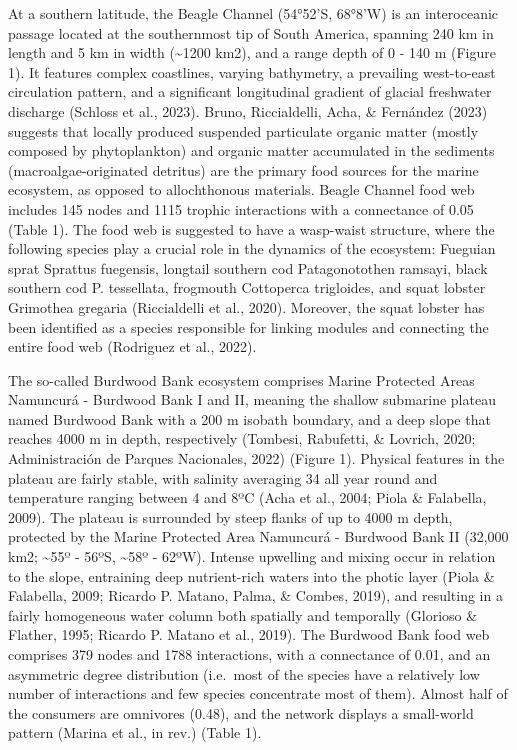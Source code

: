 \documentclass[
]{article}
\begin{document}
At a southern latitude, the Beagle Channel (54°52'S, 68°8'W) is an
interoceanic passage located at the southernmost tip of South America,
spanning 240 km in length and 5 km in width (\textasciitilde1200 km2),
and a range depth of 0 - 140 m (Figure 1). It features complex
coastlines, varying bathymetry, a prevailing west-to-east circulation
pattern, and a significant longitudinal gradient of glacial freshwater
discharge (Schloss et al., 2023). Bruno, Riccialdelli, Acha, \&
Fernández (2023) suggests that locally produced suspended particulate
organic matter (mostly composed by phytoplankton) and organic matter
accumulated in the sediments (macroalgae-originated detritus) are the
primary food sources for the marine ecosystem, as opposed to
allochthonous materials. Beagle Channel food web includes 145 nodes and
1115 trophic interactions with a connectance of 0.05 (Table 1). The food
web is suggested to have a wasp-waist structure, where the following
species play a crucial role in the dynamics of the ecosystem: Fueguian
sprat Sprattus fuegensis, longtail southern cod Patagonotothen ramsayi,
black southern cod P. tessellata, frogmouth Cottoperca trigloides, and
squat lobster Grimothea gregaria (Riccialdelli et al., 2020). Moreover,
the squat lobster has been identified as a species responsible for
linking modules and connecting the entire food web (Rodriguez et al.,
2022).

The so-called Burdwood Bank ecosystem comprises Marine Protected Areas
Namuncurá - Burdwood Bank I and II, meaning the shallow submarine
plateau named Burdwood Bank with a 200 m isobath boundary, and a deep
slope that reaches 4000 m in depth, respectively (Tombesi, Rabufetti, \&
Lovrich, 2020; Administración de Parques Nacionales, 2022) (Figure 1).
Physical features in the plateau are fairly stable, with salinity
averaging 34 all year round and temperature ranging between 4 and 8ºC
(Acha et al., 2004; Piola \& Falabella, 2009). The plateau is surrounded
by steep flanks of up to 4000 m depth, protected by the Marine Protected
Area Namuncurá - Burdwood Bank II (32,000 km2; \textasciitilde55º -
56ºS, \textasciitilde58º - 62ºW). Intense upwelling and mixing occur in
relation to the slope, entraining deep nutrient-rich waters into the
photic layer (Piola \& Falabella, 2009; Ricardo P. Matano, Palma, \&
Combes, 2019), and resulting in a fairly homogeneous water column both
spatially and temporally (Glorioso \& Flather, 1995; Ricardo P. Matano
et al., 2019). The Burdwood Bank food web comprises 379 nodes and 1788
interactions, with a connectance of 0.01, and an asymmetric degree
distribution (i.e.~most of the species have a relatively low number of
interactions and few species concentrate most of them). Almost half of
the consumers are omnivores (0.48), and the network displays a
small-world pattern (Marina et al., in rev.) (Table 1).
\end{document}
